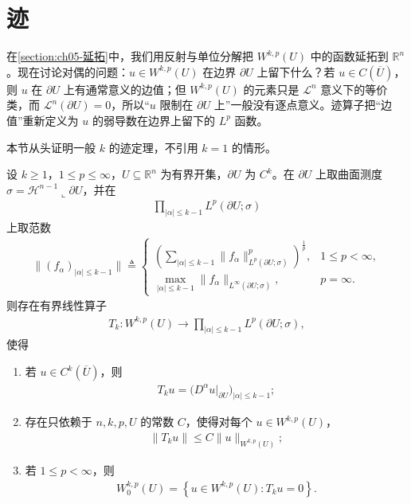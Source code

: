 \section{迹}\label{section:ch08-变分法}

在\cref{section:ch05-延拓}中，我们用反射与单位分解把 $W^{k,p}(U)$ 中的函数延拓到 $\mathbb{R}^{n}$。现在讨论对偶的问题：$u\in W^{k,p}(U)$ 在边界 $\partial U$ 上留下什么？若 $u\in C(\overline{U})$，则 $u$ 在 $\partial U$ 上有通常意义的边值；但 $W^{k,p}(U)$ 的元素只是 $\mathcal{L}^{n}$ 意义下的等价类，而 $\mathcal{L}^{n}(\partial U)=0$，所以“$u$ 限制在 $\partial U$ 上”一般没有逐点意义。迹算子把“边值”重新定义为 $u$ 的弱导数在边界上留下的 $L^{p}$ 函数。

本节从头证明一般 $k$ 的迹定理，不引用 $k=1$ 的情形。

\begin{theorem}[$W^{k,p}$ 的迹与零迹刻画]\label{theorem:ch05-零迹函数-一般}\label{theorem:ch05-零迹函数}
设 $k\geqslant1$，$1\leqslant p\leqslant\infty$，$U\subseteq\mathbb{R}^{n}$ 为有界开集，$\partial U$ 为 $C^{k}$。在 $\partial U$ 上取曲面测度 $\sigma=\mathcal{H}^{n-1}\llcorner\partial U$，并在
\begin{align*}
\prod_{|\alpha|\leqslant k-1}L^{p}(\partial U;\sigma)
\end{align*}
上取范数
\begin{align*}
\|(f_{\alpha})_{|\alpha|\leqslant k-1}\|
\triangleq
\begin{cases}
\left(\sum_{|\alpha|\leqslant k-1}\|f_{\alpha}\|_{L^{p}(\partial U;\sigma)}^{p}\right)^{\frac{1}{p}}, & 1\leqslant p<\infty,\\[2mm]
\max_{|\alpha|\leqslant k-1}\|f_{\alpha}\|_{L^{\infty}(\partial U;\sigma)}, & p=\infty.
\end{cases}
\end{align*}
则存在有界线性算子
\begin{align*}
T_{k}:W^{k,p}(U)\longrightarrow
\prod_{|\alpha|\leqslant k-1}L^{p}(\partial U;\sigma),
\end{align*}
使得
\begin{enumerate}[(1)]
\item 若 $u\in C^{k}(\overline{U})$，则
\begin{align*}
T_{k}u=\bigl(D^{\alpha}u|_{\partial U}\bigr)_{|\alpha|\leqslant k-1};
\end{align*}
\item 存在只依赖于 $n,k,p,U$ 的常数 $C$，使得对每个 $u\in W^{k,p}(U)$，
\begin{align}
\|T_{k}u\|
\leqslant
C\|u\|_{W^{k,p}(U)};
\label{eq:ch05-一般零迹-迹估计}
\end{align}
\item 若 $1\leqslant p<\infty$，则
\begin{align}
W^{k,p}_{0}(U)
=
\left\{
u\in W^{k,p}(U):T_{k}u=0
\right\}.
\label{eq:ch05-一般零迹-核}
\end{align}
\end{enumerate}
\end{theorem}

